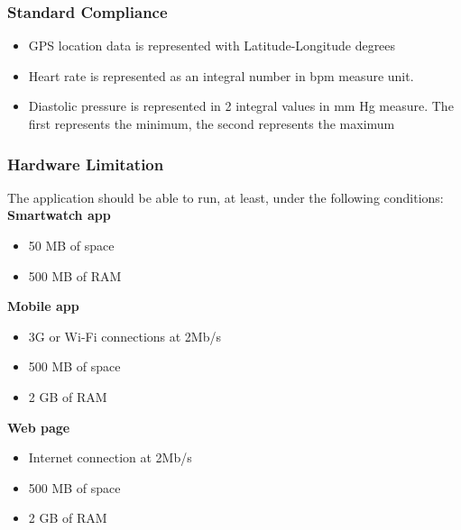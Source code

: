 \subsubsection{Standard Compliance}
\begin{itemize}
    \item GPS location data is represented with Latitude-Longitude degrees
    \item Heart rate is represented as an integral number in bpm measure unit. 
    \item Diastolic pressure is represented in 2 integral values in mm Hg measure. The first represents the minimum, the second represents the maximum
\end{itemize}

\subsubsection{Hardware Limitation}
The application should be able to run, at least, under the following conditions: 
\textbf{Smartwatch app}
\begin{itemize}
    \item 50 MB of space
    \item 500 MB of RAM
\end{itemize}
\textbf{Mobile app}
\begin{itemize}
    \item 3G or Wi-Fi connections at 2Mb/s 
    \item 500 MB of space
    \item 2 GB of RAM
\end{itemize}
\textbf{Web page}
\begin{itemize}
    \item Internet connection at 2Mb/s 
    \item 500 MB of space
    \item 2 GB of RAM 
\end{itemize}


